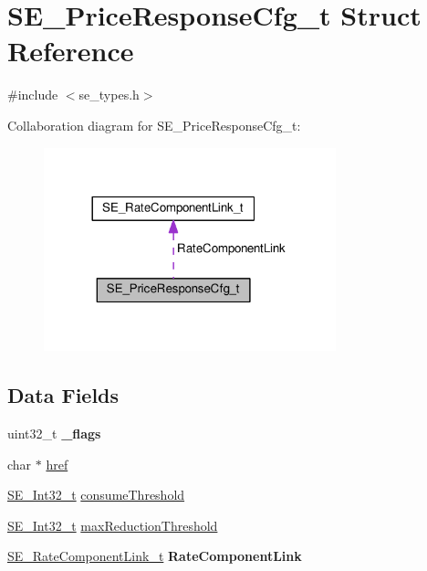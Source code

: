 \hypertarget{structSE__PriceResponseCfg__t}{}\section{S\+E\+\_\+\+Price\+Response\+Cfg\+\_\+t Struct Reference}
\label{structSE__PriceResponseCfg__t}


{\ttfamily \#include $<$se\+\_\+types.\+h$>$}



Collaboration diagram for S\+E\+\_\+\+Price\+Response\+Cfg\+\_\+t\+:\nopagebreak
\begin{figure}[H]
\begin{center}
\leavevmode
\includegraphics[width=240pt]{structSE__PriceResponseCfg__t__coll__graph}
\end{center}
\end{figure}
\subsection*{Data Fields}
\begin{DoxyCompactItemize}
\item 
uint32\+\_\+t {\bfseries \+\_\+flags}
\item 
char $\ast$ \hyperlink{group__PriceResponseCfg_ga69527458c9f8ce19064de8c147233538}{href}
\item 
\hyperlink{group__Int32_gaa7afc819cfc8033c5fa408e34da8b71a}{S\+E\+\_\+\+Int32\+\_\+t} \hyperlink{group__PriceResponseCfg_gac5930323b3f189fe2f37e2b3fa3ce664}{consume\+Threshold}
\item 
\hyperlink{group__Int32_gaa7afc819cfc8033c5fa408e34da8b71a}{S\+E\+\_\+\+Int32\+\_\+t} \hyperlink{group__PriceResponseCfg_gac8c8682a843512f53f0a853a36604a5b}{max\+Reduction\+Threshold}
\item 
\hyperlink{structSE__RateComponentLink__t}{S\+E\+\_\+\+Rate\+Component\+Link\+\_\+t} {\bfseries Rate\+Component\+Link}
\end{DoxyCompactItemize}


